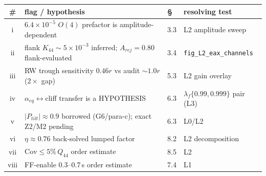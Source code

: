\documentclass[11pt,a4paper,fontset=none]{ctexart}
\begin{document}
{\footnotesize\setlength{\tabcolsep}{6pt}
\begin{tabular}{@{}c p{7.6cm} p{1.4cm} p{3.9cm}@{}}
\toprule
\# & flag / hypothesis & \S & resolving test \\
\midrule
i    & $6.4{\times}10^{-5}$ $O(4)$ prefactor is amplitude-dependent & 3.3 & L2 amplitude sweep \\
ii   & flank $K_{44}\!\sim\!5{\times}10^{-3}$ inferred; $A_{rej}{=}0.80$ flank-evaluated & 3.4 & \texttt{fig\_L2\_eax\_channels} \\
iii  & RW trough sensitivity $0.46r$ vs audit $\sim\!1.0r$ ($2\times$ gap) & 5.3 & L2 gain overlay \\
iv   & $\alpha_{eq}\!\leftrightarrow\!$cliff transfer is a HYPOTHESIS & 6.3 & $\lambda_f\{0.99,0.999\}$ pair (L3) \\
v    & $|P_{tilt}|\!\approx\!0.9$ borrowed (G6/para-c); exact Z2/M2 pending & 6.3 & L0/L2 \\
vi   & $\eta\!\approx\!0.76$ back-solved lumped factor & 8.2 & L2 decomposition \\
vii  & $\mathrm{Cov}\!\le\!5\%\,Q_{44}$ order estimate & 8.5 & L2 \\
viii & FF-enable $0.3$--$0.7$\,s order estimate & 7.4 & L1 \\
\bottomrule
\end{tabular}}
\end{document}
